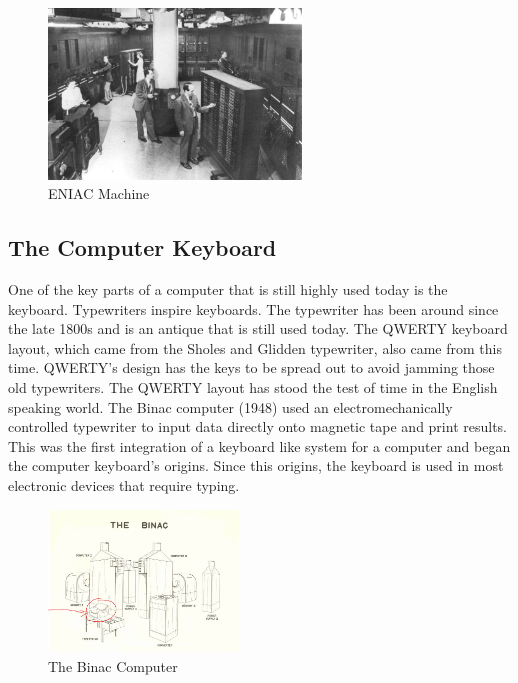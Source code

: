 \documentclass{article}
\begin{document}
\begin{figure}[h!]
    \caption{ENIAC Machine}
    \label{image:ENIAC}
    \centering
    \includegraphics[width=0.6\textwidth]{pics/eniac.jpg}
\end{figure}
\newpage
\subsection{The Computer Keyboard}
One of the key parts of a computer that is still highly used today is the keyboard. Typewriters inspire keyboards. The typewriter has been around since the late 1800s and is an antique that is still used today. The QWERTY keyboard layout, which came from the Sholes and Glidden typewriter, also came from this time. QWERTY's design has the keys to be spread out to avoid jamming those old typewriters. The QWERTY layout has stood the test of time in the English speaking world. The Binac computer (1948) used an electromechanically controlled typewriter to input data directly onto magnetic tape and print results. This was the first integration of a keyboard like system for a computer and began the computer keyboard's origins. Since this origins, the keyboard is used in most electronic devices that require typing. 
\cite{ref3}

\begin{figure}[h!]
    \caption{The Binac Computer}
    \label{image:BINAC}
    \centering
    \includegraphics[width=0.45\textwidth]{pics/binac.jpg}
\end{figure}
\end{document}
